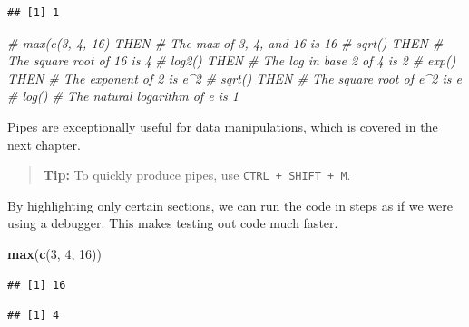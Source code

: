 \documentclass[
  openany]{book}
\newenvironment{Shaded}{\begin{snugshade}}{\end{snugshade}}
\newcommand{\CommentTok}[1]{\textcolor[rgb]{0.56,0.35,0.01}{\textit{#1}}}
\newcommand{\DecValTok}[1]{\textcolor[rgb]{0.00,0.00,0.81}{#1}}
\newcommand{\KeywordTok}[1]{\textcolor[rgb]{0.13,0.29,0.53}{\textbf{#1}}}
\newcommand{\NormalTok}[1]{#1}
\newcommand{\OperatorTok}[1]{\textcolor[rgb]{0.81,0.36,0.00}{\textbf{#1}}}
\newcommand{\StringTok}[1]{\textcolor[rgb]{0.31,0.60,0.02}{#1}}
\begin{document}
\begin{verbatim}
## [1] 1
\end{verbatim}

\begin{Shaded}
\begin{Highlighting}[]
\CommentTok{# max(c(3, 4, 16) THEN  # The max of 3, 4, and 16 is 16}
\CommentTok{#  sqrt() THEN          # The square root of 16 is 4}
\CommentTok{#  log2() THEN          # The log in base 2 of 4 is 2}
\CommentTok{#  exp() THEN           # The exponent of 2 is e^2}
\CommentTok{#  sqrt() THEN          # The square root of e^2 is e}
\CommentTok{#  log()                # The natural logarithm of e is 1}
\end{Highlighting}
\end{Shaded}

Pipes are exceptionally useful for data manipulations, which is covered in the
next chapter.

\begin{quote}
\textbf{Tip:} To quickly produce pipes, use \texttt{CTRL\ +\ SHIFT\ +\ M}.
\end{quote}

By highlighting only certain sections, we can run the code in steps as if we were
using a debugger. This makes testing out code much faster.

\begin{Shaded}
\begin{Highlighting}[]
\KeywordTok{max}\NormalTok{(}\KeywordTok{c}\NormalTok{(}\DecValTok{3}\NormalTok{, }\DecValTok{4}\NormalTok{, }\DecValTok{16}\NormalTok{))}
\end{Highlighting}
\end{Shaded}

\begin{verbatim}
## [1] 16
\end{verbatim}

\begin{Shaded}
\end{Shaded}

\begin{verbatim}
## [1] 4
\end{verbatim}

\begin{Shaded}
\end{Shaded}
\end{document}
